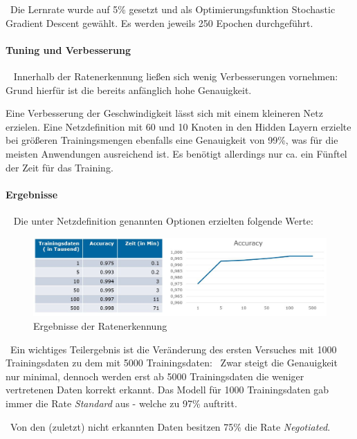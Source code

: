 ~\newline Die Lernrate wurde auf 5\% gesetzt und als Optimierungsfunktion Stochastic Gradient Descent gewählt. Es werden jeweils 250 Epochen durchgeführt. 
\paragraph{Tuning und Verbesserung} ~\newline
Innerhalb der Ratenerkennung ließen sich wenig Verbesserungen vornehmen: Grund hierfür ist die bereits anfänglich hohe Genauigkeit. 

Eine Verbesserung der Geschwindigkeit lässt sich mit einem kleineren Netz erzielen. Eine Netzdefinition mit 60 und 10 Knoten in den Hidden Layern erzielte bei größeren Trainingsmengen ebenfalls eine Genauigkeit von 99\%, was für die meisten Anwendungen ausreichend ist. Es benötigt allerdings nur ca. ein Fünftel der Zeit für das Training.
\paragraph{Ergebnisse} ~\newline
Die unter Netzdefinition genannten Optionen erzielten folgende Werte:

\begin{figure}[h]
	\begin{center}
		\includegraphics[width=0.95\linewidth]{Bilder/RatenErgebnisse}
		\caption[Ergebnisse der Trinkgeldprognose]{Ergebnisse der Ratenerkennung}
		\label{fig:RateErg}
	\end{center}
\end{figure}

~\newline Ein wichtiges Teilergebnis ist die Veränderung des ersten Versuches mit 1000 Trainingsdaten zu dem mit 5000 Trainingsdaten: 
~\newline Zwar steigt die Genauigkeit nur minimal, dennoch werden erst ab 5000 Trainingsdaten die weniger vertretenen Daten korrekt erkannt. Das Modell für 1000 Trainingsdaten gab immer die Rate \textit{Standard} aus - welche zu 97\% auftritt. 


~\newline Von den (zuletzt) nicht erkannten Daten besitzen 75\% die Rate \textit{Negotiated}.

